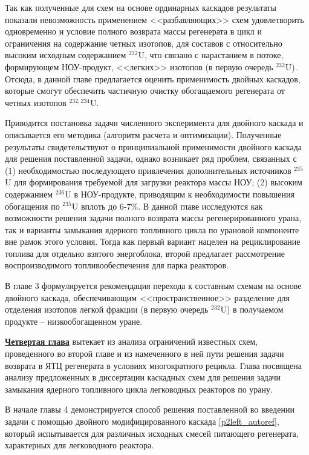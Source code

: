 Так как полученные для схем на основе ординарных каскадов результаты показали невозможность применением <<разбавляющих>> схем удовлетво­рить одновременно и условие полного возврата массы регенерата в цикл и ограничения на содержание четных изотопов, для составов с относительно высоким исходным содержанием $^{232}$U, что связано с нарастанием в потоке, формирующем НОУ-продукт, <<легких>> изотопов (в первую очередь $^{232}$U). Отсюда, в данной главе предлагается оценить применимость двойных каскадов, которые смогут обеспечить частичную очистку обогащаемого регенерата от четных изотопов $^{232,234}$U.

Приводится постановка задачи численного эксперимента для двойного каскада и описывается его методика (алгоритм расчета и оптимизации). Полученные результаты свидетельствуют о принципиальной применимости двойного каскада для решения поставленной задачи, однако возникает ряд проблем, связанных с (1) необходимостью последующего привлечения дополнительных источников $^{235}$U для формирования требуемой для загрузки реактора массы НОУ; (2) высоким содержанием $^{236}$U в НОУ-продукте, приводящим к необходимости повышения обогащения по $^{235}$U вплоть до 6-7\%.
В данной главе исследуются как возможности решения задачи полного возврата массы регенерированного урана, так и варианты замыкания ядерного топливного цикла по урановой компоненте вне рамок этого условия. Тогда как первый вариант нацелен на рециклирование топлива для отдельно взятого энергоблока, второй предлагает рассмотрение воспроизводимого топливообеспечения для парка реакторов.

В главе 3 формулируется рекомендация перехода к составным схемам на основе двойного каскада, обеспечивающим <<пространственное>> разделение для отделения изотопов легкой фракции (в первую очередь $^{232}$U) в получаемом продукте -- низкообогащенном уране.

\underline{\textbf{Четвертая глава}} вытекает из анализа ограничений известных схем, проведенного во второй главе и из намеченного в ней пути решения задачи возврата в ЯТЦ регенерата в условиях многократного рецикла.
Глава посвящена анализу предложенных в диссертации каскадных схем для решения задачи замыкания ядерного топливного цикла легководных реакторов по урану.

В начале главы 4 демонстрируется способ решения поставленной во введении задачи с помощью двойного модифицированного каскада \ref{p2left_autoref}, который испытывается для различных исходных смесей питающего регенерата, характерных для легководного реактора.


